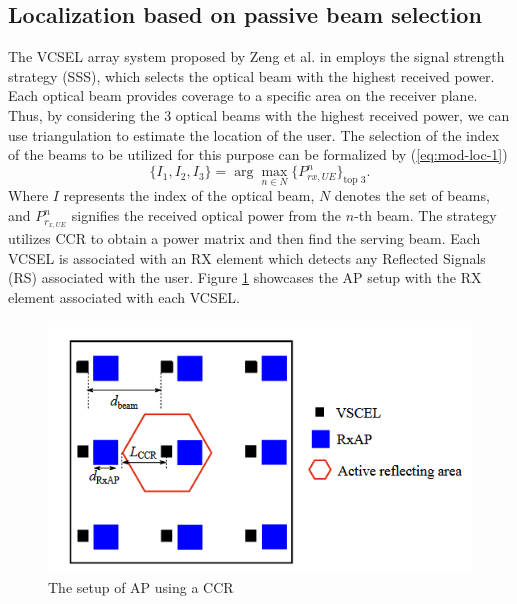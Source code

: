 \subsection{Localization based on passive beam selection}
\label{subsec:mod-loc-pas-beam}
The VCSEL array system proposed by Zeng et al. in \cite{zeng_vcsel_2022} employs the signal strength strategy (SSS), which selects the optical beam with the highest received power. Each optical beam provides coverage to a specific area on the receiver plane. Thus, by considering the 3 optical beams with the highest received power, we can use triangulation to estimate the location of the user. The selection of the index of the beams to be utilized for this purpose can be formalized by (\ref{eq:mod-loc-1})
\begin{equation}
    \{I_1, I_2, I_3\} = \arg \max_{n \in N} \{{P_{rx,UE}^n}\}_{\text{top 3}}.
    \label{eq:mod-loc-1}
\end{equation}
Where \(I\) represents the index of the optical beam, \(N\) denotes the set of beams, and \(P_{r_{x,UE}}^n\) signifies the received optical power from the \(n\)-th beam. The strategy utilizes CCR to obtain a power matrix and then find the serving beam. Each VCSEL is associated with an RX element which detects any Reflected Signals (RS) associated with the user. Figure \ref{fig:mod-loc-ap} showcases the AP setup with the RX element associated with each VCSEL.
\begin{figure}
    \centering
    \includegraphics[width=0.75\linewidth]{Figures/modeling-localization-ap-design.png}
    \caption{The setup of AP using a CCR\cite{zeng_vcsel_2022}}
    \label{fig:mod-loc-ap}
\end{figure}


